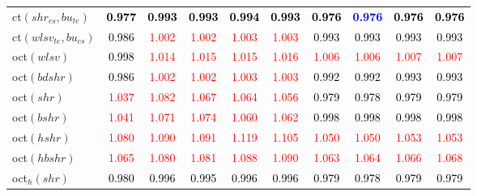 \begin{tabular}[t]{l|ccccccccc}
ct$(shr_{cs}, bu_{te})$ & \textcolor{black}{\textbf{0.977}} & \textcolor{black}{\textbf{0.993}} & \textcolor{black}{\textbf{0.993}} & \textcolor{black}{\textbf{0.994}} & \textcolor{black}{\textbf{0.993}} & \textcolor{black}{\textbf{0.976}} & \textcolor{blue}{\textbf{0.976}} & \textcolor{black}{\textbf{0.976}} & \textcolor{black}{\textbf{0.976}}\\
ct$(wlsv_{te}, bu_{cs})$ & \textcolor{black}{0.986} & \textcolor{red}{1.002} & \textcolor{red}{1.002} & \textcolor{red}{1.003} & \textcolor{red}{1.003} & \textcolor{black}{0.993} & \textcolor{black}{0.993} & \textcolor{black}{0.993} & \textcolor{black}{0.993}\\
oct$(wlsv)$ & \textcolor{black}{0.998} & \textcolor{red}{1.014} & \textcolor{red}{1.015} & \textcolor{red}{1.015} & \textcolor{red}{1.016} & \textcolor{red}{1.006} & \textcolor{red}{1.006} & \textcolor{red}{1.007} & \textcolor{red}{1.007}\\
oct$(bdshr)$ & \textcolor{black}{0.986} & \textcolor{red}{1.002} & \textcolor{red}{1.002} & \textcolor{red}{1.003} & \textcolor{red}{1.003} & \textcolor{black}{0.992} & \textcolor{black}{0.992} & \textcolor{black}{0.993} & \textcolor{black}{0.993}\\
oct$(shr)$ & \textcolor{red}{1.037} & \textcolor{red}{1.082} & \textcolor{red}{1.067} & \textcolor{red}{1.064} & \textcolor{red}{1.056} & \textcolor{black}{0.979} & \textcolor{black}{0.978} & \textcolor{black}{0.979} & \textcolor{black}{0.979}\\
oct$(bshr)$ & \textcolor{red}{1.041} & \textcolor{red}{1.071} & \textcolor{red}{1.074} & \textcolor{red}{1.060} & \textcolor{red}{1.062} & \textcolor{black}{0.998} & \textcolor{black}{0.998} & \textcolor{black}{0.998} & \textcolor{black}{0.998}\\
oct$(hshr)$ & \textcolor{red}{1.080} & \textcolor{red}{1.090} & \textcolor{red}{1.091} & \textcolor{red}{1.119} & \textcolor{red}{1.105} & \textcolor{red}{1.050} & \textcolor{red}{1.050} & \textcolor{red}{1.053} & \textcolor{red}{1.053}\\
oct$(hbshr)$ & \textcolor{red}{1.065} & \textcolor{red}{1.080} & \textcolor{red}{1.081} & \textcolor{red}{1.088} & \textcolor{red}{1.090} & \textcolor{red}{1.063} & \textcolor{red}{1.064} & \textcolor{red}{1.066} & \textcolor{red}{1.068}\\
oct$_h(shr)$ & \textcolor{black}{0.980} & \textcolor{black}{0.996} & \textcolor{black}{0.995} & \textcolor{black}{0.996} & \textcolor{black}{0.996} & \textcolor{black}{0.979} & \textcolor{black}{0.978} & \textcolor{black}{0.979} & \textcolor{black}{0.979}\\

\end{tabular}
